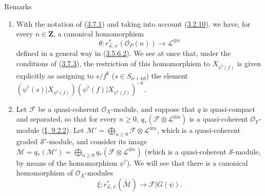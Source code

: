 \begin{namedtheorem}[3.7.9]{Remarks}
\label{II.3.7.9}
\begin{enumerate}
  \item[(i)] With the notation of (\hyperref[II.3.7.1]{3.7.1}) and
    taking into account (\hyperref[II.3.2.10]{3.2.10}), we have, for every
    $n\in\mathbf{Z}$, a canonical homomorphism
    \[
    \label{II.3.7.9.1}
      \theta:r_{\mathcal{L},\psi}^*(\mathcal{O}_P(n))\longrightarrow
      \mathcal{L}^{\otimes n}
    \tag{3.7.9.1}
    \]
    defined in a general way in
    (\hyperref[II.3.5.6.2]{3.5.6.2}). We see at once that, under the
    conditions of (\hyperref[II.3.7.3]{3.7.3}), the restriction of this
    homomorphism to $X_{\psi^\flat(f)}$ is given explicitly as assigning
    to $s/f^k$ ($s\in S_{n+kd}$) the element
    $(\psi^\flat(s)|X_{\psi^\flat(f)})
    (\psi^\flat(f)|X_{\psi^\flat(f)})^{-k}$.
  \item[(ii)] Let $\mathcal{F}$ be a quasi-coherent $\mathcal{O}_X$-module, and
    suppose that $q$ is quasi-compact and separated, so that for every
    $n\geq0$, $q_*(\mathcal{F}\otimes\mathcal{L}^{\otimes n})$ is a
    quasi-coherent $\mathcal{O}_Y$-module
    (\hyperref[I.9.2.2]{I, 9.2.2}). Let
    $\mathcal{M}'=\bigoplus_{n\geq0}\mathcal{F}\otimes
    \mathcal{L}^{\otimes n}$, which is a quasi-coherent graded
    $\mathcal{S}'$-module, and consider its image
    $\mathcal{M}=q_*(\mathcal{M}')=
    \bigoplus_{n\geq0}q_*(\mathcal{F}\otimes\mathcal{L}^{\otimes n})$
    (which is a quasi-coherent $\mathcal{S}$-module, by means of
    the homomorphism $\psi^\flat$). We will see that there is a
    canonical homomorphism of $\mathcal{O}_X$-modules
    \[
    \label{II.3.7.9.2}
      \xi:r_{\mathcal{L},\psi}^*(\widetilde{\mathcal{M}})
      \longrightarrow\mathcal{F}|G(\psi).
    \tag{3.7.9.2}
    \]


\end{enumerate}
\end{namedtheorem}
